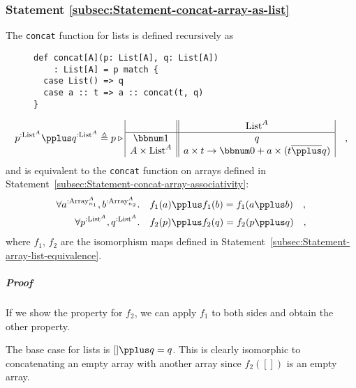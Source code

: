 \subsubsection{Statement \label{subsec:Statement-concat-array-as-list}\ref{subsec:Statement-concat-array-as-list}}

The \lstinline!concat! function for lists is defined recursively
as

\begin{wrapfigure}{l}{0.38\columnwidth}%
\vspace{-0.75\baselineskip}
\begin{lstlisting}
def concat[A](p: List[A], q: List[A])
    : List[A] = p match {
  case List() => q
  case a :: t => a :: concat(t, q)
}
\end{lstlisting}

\vspace{-2.5\baselineskip}
\end{wrapfigure}%

\noindent \vspace{-0.9\baselineskip}
\[
p^{:\text{List}^{A}}\pplus q^{:\text{List}^{A}}\triangleq p\triangleright\begin{array}{|c||c|}
 & \text{List}^{A}\\
\hline \bbnum 1 & q\\
A\times\text{List}^{A} & a\times t\rightarrow\bbnum 0+a\times(t\overline{\pplus}q)
\end{array}\quad,
\]
and is equivalent to the \lstinline!concat! function on arrays defined
in Statement~\ref{subsec:Statement-concat-array-associativity}:
\begin{align*}
\forall a^{:\text{Array}_{n_{1}}^{A}},b^{:\text{Array}_{n_{2}}^{A}}.\quad & f_{1}(a)\pplus f_{1}(b)=f_{1}(a\pplus b)\quad,\\
\forall p^{:\text{List}^{A}},q^{:\text{List}^{A}}.\quad & f_{2}(p)\pplus f_{2}(q)=f_{2}(p\pplus q)\quad,
\end{align*}
where $f_{1}$, $f_{2}$ are the isomorphism maps defined in Statement~\ref{subsec:Statement-array-list-equivalence}.

\subparagraph{Proof}

If we show the property for $f_{2}$, we can apply $f_{1}$ to both
sides and obtain the other property.

The base case for lists is $[]\pplus q=q$. This is clearly isomorphic
to concatenating an empty array with another array since $f_{2}([])$
is an empty array. 

